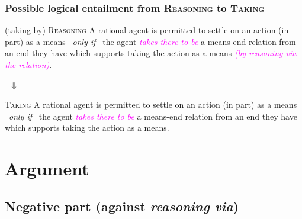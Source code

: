 \documentclass[noamssymb,
graphics,
]{beamer} %
\newcommand{\schemaName}[1]{\textsc{#1}}
\begin{document}
\begin{frame}
  \frametitle{Possible logical entailment from \schemaName{Reasoning} to \schemaName{Taking}}

  \begin{block}{(taking by) \schemaName{Reasoning}}
   A rational agent is permitted to settle on an action (in part) as a means
    \newline
    \mbox{ }\hfill\emph{only if}\hfill\mbox{ }
    \newline
    the agent \textcolor{fuchsia}{\emph{takes there to be}} a means-end relation from an end they have which supports taking the action as a means \textcolor{fuchsia}{\emph{(by reasoning via the relation)}}.
  \end{block}

  {\Large \mbox{ }\hfill\(\Downarrow\)\hfill\mbox{ }}

  \begin{block}{\schemaName{Taking}}
    A rational agent is permitted to settle on an action (in part) as a means
    \newline
    \mbox{ }\hfill\emph{only if}\hfill\mbox{ }
    \newline
    the agent \textcolor{fuchsia}{\emph{takes there to be}} a means-end relation from an end they have which supports taking the action as a means.
  \end{block}

\end{frame}


\section{Argument}
\label{sec:argument}


\subsection{Negative part (against \emph{reasoning via})}%
\label{sec:negative}
\end{document}
